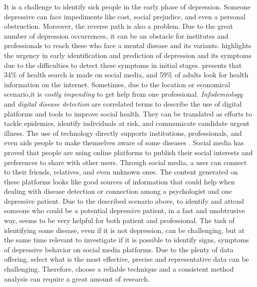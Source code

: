 \documentclass[11pt, notitlepage]{article} %
\begin{document}
It is a challenge to identify sick people in the early phase of depression. Someone depressive can face impediments like cost, social prejudice, and even a personal obstruction. Moreover, the reverse path is also a problem. Due to the great number of depression occurrences, it can be an obstacle for institutes and professionals to reach these who face a mental disease and its variants. \cite{Lech2014} highlights the urgency in early identification and prediction of depression and its symptoms due to the difficulties to detect these symptoms in initial stages. \cite{elkin2008america} presents that 34\% of health search is made on social media, and 59\% of adults look for health information on the internet.
Sometimes, due to the location or economical scenario,it is \textit{costly impending} to get help from one professional. 
\textit{Infodemiology} and \textit{digital disease detection} are correlated terms to describe the use of digital platforms and tools to improve social health. They can be translated as efforts to tackle epidemics, identify individuals at risk, and communicate candidate urgent illness. The use of technology directly supports institutions, professionals, and even aids people to make themselves aware of some diseases \cite{Horvitz}.
Social media has proved that people are using online platforms to publish their social interests and preferences to share with other users. 
Through social media, a user can connect to their friends, relatives, and even unknown ones. 
The content generated on these platforms looks like good sources of information that could help when dealing with disease detection or connection among a psychologist and one depressive patient.
Due to the described scenario above, to identify and attend someone who could be a potential depressive patient, in a fast and unobtrusive way, seems to be very helpful for both patient and professional.
The task of identifying some disease, even if it is not depression, can be challenging, but at the same time relevant to investigate if it is possible to identify signs, symptoms of depressive behavior on social media platforms.  
Due to the plenty of data offering, select what is the most effective, precise and representative data can be challenging. Therefore, choose a reliable technique and a consistent method analysis can require a great amount of research.
\end{document}
